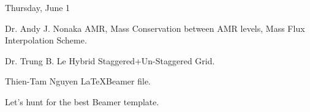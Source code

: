 \documentclass[\string~/GitHub/sthlmNordBeamerTheme/sthlmNordLightDemo.tex]{subfiles}
\begin{document}
\begin{frame}[c]{Thursday, June 1}
    \begin{block}{Dr. Andy J. Nonaka}
        AMR, Mass Conservation between AMR levels, Mass Flux Interpolation Scheme.
    \end{block}

    \begin{exampleblock}{Dr. Trung B. Le}
        Hybrid Staggered+Un-Staggered Grid.
    \end{exampleblock}

    \begin{alertblock}{Thien-Tam Nguyen}
        \LaTeX Beamer file.
    \end{alertblock}

    \remarks Let's hunt for the best Beamer template.
 
\end{frame}
\end{document}
